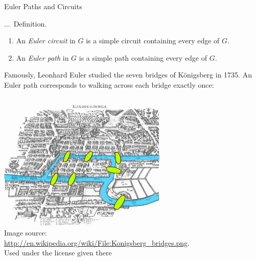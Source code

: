 \documentclass[smaller,hyperref={CJKbookmarks=true}]{beamer}
\newcounter{zhuo}[subsection]
\renewcommand{\thezhuo}{\thesection.\thesubsection.\arabic{zhuo}}
\newenvironment{DEFINITION}{\stepcounter{zhuo}\alert{\thezhuo.~Definition.\,}}{}
\begin{document}
\begin{frame}{Euler Paths and Circuits}
\begin{spacing}{1.05}
\begin{DEFINITION}
\begin{enumerate}[1.]
  \item An \emph{Euler circuit} in $G$ is a simple circuit containing every edge of $G$.
  \item An \emph{Euler path} in $G$ is a simple path containing every edge of $G$.
\end{enumerate}
Famously, Leonhard Euler studied the seven bridges of K\"{o}nigsberg in 1735.
An Euler path corresponds to walking across each bridge exactly once:\\[3pt]
\begin{columns}[onlytextwidth]
\begin{column}{0.5\textwidth}
\begin{center}
\begin{spacing}{0.5}
\begin{tiny}
\includegraphics[width=0.8\columnwidth]{bridge.jpg}\\
Image source:\\
\url{http://en.wikipedia.org/wiki/File:Konigsberg_bridges.png}.\\
Used under the license given there
\end{tiny}
\end{spacing}
\end{center}
\end{column}
\begin{column}{0.5\textwidth}
\begin{center}
\begin{tikzpicture}[thick,every node/.style={inner sep=0pt,minimum size=3.5mm}]

\end{tikzpicture}
\end{center}
\end{column}
\end{columns}
\end{DEFINITION}
\end{spacing}
\end{frame}
\end{document}
